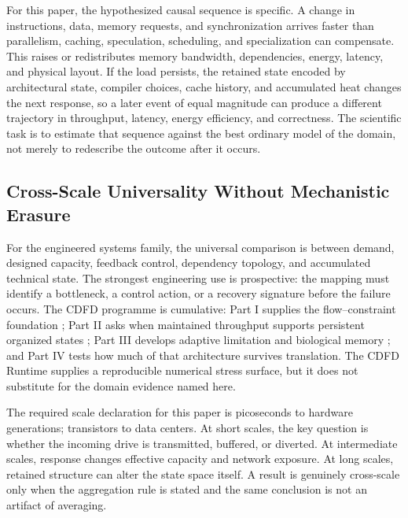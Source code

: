 \documentclass[11pt]{article}
\begin{document}
For this paper, the hypothesized causal sequence is specific. A change in
instructions, data, memory requests, and synchronization arrives faster than parallelism, caching, speculation, scheduling, and specialization can compensate.
This raises or redistributes memory bandwidth, dependencies, energy, latency, and physical layout. If the load persists,
the retained state encoded by architectural state, compiler choices, cache history, and accumulated heat changes the next response, so a later event of equal
magnitude can produce a different trajectory in throughput, latency, energy efficiency, and correctness. The
scientific task is to estimate that sequence against the best ordinary model of
the domain, not merely to redescribe the outcome after it occurs.

\subsection{Cross-Scale Universality Without Mechanistic Erasure}

For the engineered systems family, the universal comparison is between demand, designed capacity, feedback control, dependency topology, and accumulated technical state. The strongest engineering use is prospective: the mapping must identify a bottleneck, a control action, or a recovery signature before the failure occurs. \cite{BarabasiAlbert1999,WattsStrogatz1998,Shannon1948,BakTangWiesenfeld1987}
The CDFD programme is cumulative: Part I supplies the flow--constraint
foundation \cite{MujjabiPartI2026}; Part II asks when maintained throughput
supports persistent organized states \cite{MujjabiPartII2026}; Part III
develops adaptive limitation and biological memory \cite{MujjabiPartIII2026};
and Part IV \cite{MujjabiPartIV2026} tests how much of that architecture
survives translation. The CDFD Runtime \cite{CDFDRuntime2026} supplies a
reproducible numerical stress surface, but it does not substitute for the
domain evidence named here.

The required scale declaration for this paper is picoseconds to hardware generations; transistors to data centers. At short
scales, the key question is whether the incoming drive is transmitted,
buffered, or diverted. At intermediate scales, response changes effective
capacity and network exposure. At long scales, retained structure can alter the
state space itself. A result is genuinely cross-scale only when the aggregation
rule is stated and the same conclusion is not an artifact of averaging.
\end{document}
